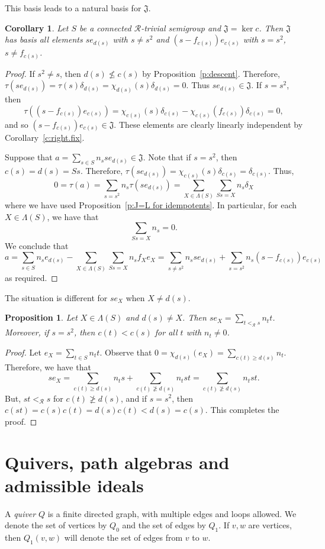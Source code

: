 \documentclass[reqno,11pt]{amsart}
\newcommand{\R}{\mathrel{\mathscr R}} %
\newtheorem{Prop}[Thm]{Proposition}
\newtheorem{Cor}[Thm]{Corollary}
{\theoremstyle{remark}
\newtheorem{Step}{Step}}
{\theoremstyle{remark}
\newtheorem{Example}[Thm]{Example}}
\numberwithin{equation}{section}
\begin{document}
This basis leads to a natural basis for $\mathfrak J$.

\begin{Cor}\label{c:rad.basis}
Let $S$ be a connected $\mathscr R$-trivial semigroup and $\mathfrak J=\ker c$.  Then $\mathfrak J$ has basis all elements $se_{d(s)}$ with $s\neq s^2$ and $(s-f_{c(s)})e_{c(s)}$ with $s=s^2$, $s\neq f_{c(s)}$.    
\end{Cor}
\begin{proof}
If $s^2\neq s$, then $d(s)\nleq c(s)$ by Proposition~\ref{p:descent}.  Therefore, $\tau(se_{d(s)}) =\tau(s)\delta_{d(s)} = \chi_{d(s)}(s)\delta_{d(s)} =0$.  Thus $se_{d(s)}\in \mathfrak J$.   If $s=s^2$, then \[\tau((s-f_{c(s)})e_{c(s)})= \chi_{c(s)}(s)\delta_{c(s)}-\chi_{c(s)}(f_{c(s)})\delta_{c(s)} = 0,\] and so $(s-f_{c(s)})e_{c(s)}\in \mathfrak J$.  These elements are clearly linearly independent by Corollary~\ref{c:right.fix}.

Suppose that $a=\sum_{s\in S}n_sse_{d(s)}\in \mathfrak J$.   Note that if $s=s^2$, then $c(s)=d(s)=Ss$.  Therefore, $\tau(se_{d(s)}) = \chi_{c(s)}(s)\delta_{c(s)} = \delta_{c(s)}$.  Thus, \[0 = \tau(a) = \sum_{s=s^2}n_s\tau(se_{d(s)}) =\sum_{X\in \Lambda(S)}\sum_{Ss=X}n_s\delta_X\] where we have used Proposition~\ref{p:J=L for idempotents}.  In particular, for each $X\in \Lambda(S)$,  we have that \[\sum_{Ss=X}n_s=0.\]  We conclude that 
\[a=\sum_{s\in S}n_se_{d(s)}-\sum_{X\in \Lambda(S)}\sum_{Ss=X}n_sf_Xe_X=\sum_{s\neq s^2} n_sse_{d(s)} +\sum_{s=s^2}n_s(s-f_{c(s)})e_{c(s)}\] as required.
\end{proof}

The situation is different for $se_X$ when $X\neq d(s)$.

\begin{Prop}\label{p:wrong.support}
Let $X\in \Lambda(S)$ and $d(s)\neq X$.  Then $se_X=\sum_{t<_{\R}s}n_tt$.    Moreover, if $s=s^2$, then $c(t)<c(s)$ for all $t$ with $n_t\neq 0$. 
\end{Prop}
\begin{proof}
Let $e_{X} = \sum_{t\in S}n_tt$.
    Observe that $0=\chi_{d(s)}(e_X)=\sum_{c(t)\geq d(s)} n_t$.  Therefore, we have that \[se_X = \sum_{c(t)\geq d(s)}n_ts+\sum_{c(t)\ngeq d(s)}n_tst = \sum_{c(t)\ngeq d(s)}n_tst. \]  But, $st<_{\R} s$ for $c(t)\ngeq d(s)$, and if $s=s^2$, then $c(st)=c(s)c(t)=d(s)c(t)<d(s)=c(s)$.  This completes the proof.
\end{proof}

\section{Quivers, path algebras and admissible ideals}
A \emph{quiver} $Q$ is a finite directed graph, with multiple edges and loops allowed. We denote the set of vertices by $Q_0$ and the set of edges by $Q_1$. If $v,w$ are vertices, then $Q_1(v,w)$ will denote the set of edges from $v$ to $w$.  
\end{document}
